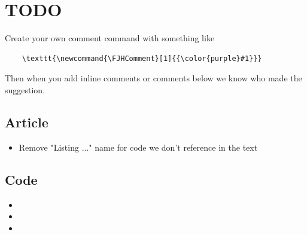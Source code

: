 \documentclass{article}[12pt]
\newcommand{\FJHComment}[1]{{\color{purple}Fred:  #1}}
\begin{document}
\section*{TODO}

Create your own comment command with something like
\begin{verbatim}
    \texttt{\newcommand{\FJHComment}[1]{{\color{purple}#1}}}
\end{verbatim} 
Then when you add inline comments or comments below we know who made the suggestion. 

\subsection*{Article}

\begin{itemize}
    \item Remove "Listing ..." name for code we don't reference in the text 
\end{itemize}

\subsection*{Code}

\begin{itemize}
    \item {}
    \item {}
    \item {}
\end{itemize}
\end{document}
